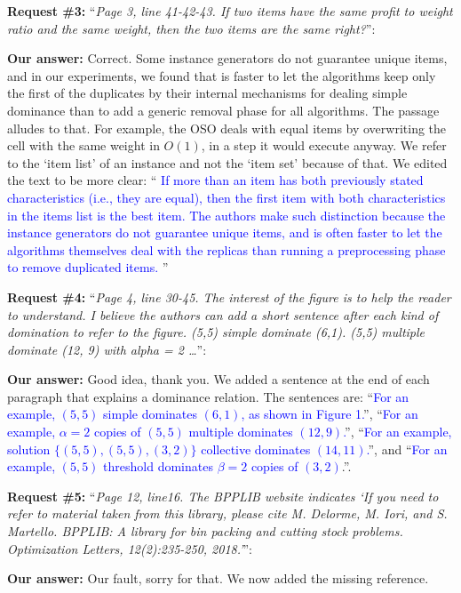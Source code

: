 \documentclass{elsarticle}
\begin{document}
\textbf{Request \#3:} ``\textit{Page 3, line 41-42-43. If two items have the same profit to weight ratio and the same weight, then the two items are the same right?}'':

\textbf{Our answer:}
Correct.
Some instance generators do not guarantee unique items, and in our experiments, we found that is faster to let the algorithms keep only the first of the duplicates by their internal mechanisms for dealing simple dominance than to add a generic removal phase for all algorithms.
The passage alludes to that.
For example, the OSO deals with equal items by overwriting the cell with the same weight in \(O(1)\), in a step it would execute anyway.
We refer to the `item list' of an instance and not the `item set' because of that.
We edited the text to be more clear: ``\textcolor{blue}{
If more than an item has both previously stated characteristics (i.e., they are equal), then the first item with both characteristics in the items list is the best item.
The authors make such distinction because the instance generators do not guarantee unique items, and is often faster to let the algorithms themselves deal with the replicas than running a preprocessing phase to remove duplicated items.
}''
\bigskip

\textbf{Request \#4:} ``\textit{Page 4, line 30-45. The interest of the figure is to help the reader to understand. I believe the authors can add a short sentence after each kind of domination to refer to the figure. (5,5) simple dominate (6,1). (5,5) multiple dominate (12, 9) with alpha = 2 \dots}'':

\textbf{Our answer:} Good idea, thank you. We added a sentence at the end of each paragraph that explains a dominance relation. The sentences are: ``\textcolor{blue}{For an example, \((5, 5)\) simple dominates \((6, 1)\), as shown in Figure 1.}'', ``\textcolor{blue}{For an example, \(\alpha = 2\) copies of \((5, 5)\) multiple dominates \((12, 9)\).}'', ``\textcolor{blue}{For an example, solution \(\{(5, 5), (5, 5), (3, 2)\}\) collective dominates \((14, 11)\).}'', and ``\textcolor{blue}{For an example, \((5, 5)\) threshold dominates \(\beta = 2\) copies of \((3, 2)\)}.''.
\bigskip

\textbf{Request \#5:} ``\textit{Page 12, line16. The BPPLIB website indicates `If you need to refer to material taken from this library, please cite M. Delorme, M. Iori, and S. Martello. BPPLIB: A library for bin packing and cutting stock problems. Optimization Letters, 12(2):235-250, 2018.'}'':

\textbf{Our answer:} Our fault, sorry for that. We now added the missing reference.
\bigskip
\end{document}
